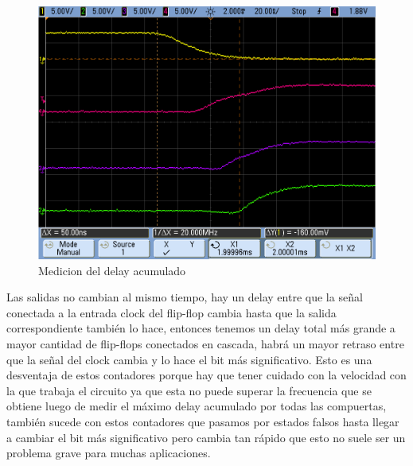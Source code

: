 \begin{figure}
\begin{center}
\includegraphics[scale=0.25]{ejercicio7/imagenes/timepropagation.png}
\caption{Medicion del delay acumulado}\label{7_fig3}
\end{center}
\end{figure}

Las salidas no cambian al mismo tiempo, hay un delay entre que la señal conectada a la entrada clock del flip-flop cambia hasta que la salida correspondiente también lo hace, entonces tenemos un delay total más grande a mayor cantidad de flip-flops conectados en cascada, habrá un mayor retraso entre que la señal del clock cambia y lo hace el bit más significativo. Esto es una desventaja de estos contadores porque hay que tener cuidado con la velocidad con la que trabaja el circuito ya que esta no puede superar la frecuencia que se obtiene luego de medir el máximo delay acumulado por todas las compuertas, también sucede con estos contadores que pasamos por estados falsos hasta llegar a cambiar el bit más significativo pero cambia tan rápido que esto no suele ser un problema grave para muchas aplicaciones.

